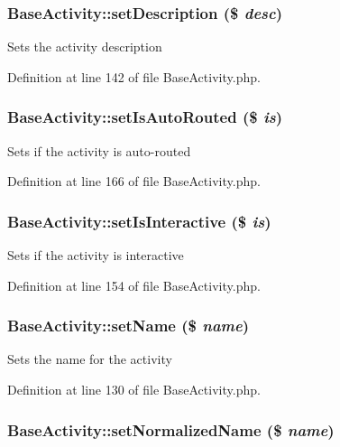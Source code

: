 \subsubsection{\setlength{\rightskip}{0pt plus 5cm}Base\-Activity::set\-Description (\$ {\em desc})}\label{classBaseActivity_a9}


Sets the activity description 

Definition at line 142 of file Base\-Activity.php.
\subsubsection{\setlength{\rightskip}{0pt plus 5cm}Base\-Activity::set\-Is\-Auto\-Routed (\$ {\em is})}\label{classBaseActivity_a13}


Sets if the activity is auto-routed 

Definition at line 166 of file Base\-Activity.php.
\subsubsection{\setlength{\rightskip}{0pt plus 5cm}Base\-Activity::set\-Is\-Interactive (\$ {\em is})}\label{classBaseActivity_a11}


Sets if the activity is interactive 

Definition at line 154 of file Base\-Activity.php.
\subsubsection{\setlength{\rightskip}{0pt plus 5cm}Base\-Activity::set\-Name (\$ {\em name})}\label{classBaseActivity_a7}


Sets the name for the activity 

Definition at line 130 of file Base\-Activity.php.
\subsubsection{\setlength{\rightskip}{0pt plus 5cm}Base\-Activity::set\-Normalized\-Name (\$ {\em name})}\label{classBaseActivity_a6}


